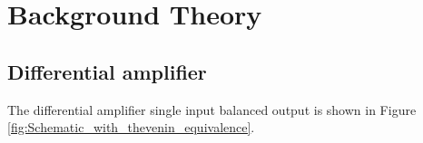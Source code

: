 \section{Background Theory}
\label{sec:Theoretical_Background}

\subsection{Differential amplifier}
The differential amplifier single input balanced output is shown in Figure \ref{fig:Schematic_with_thevenin_equivalence}.

